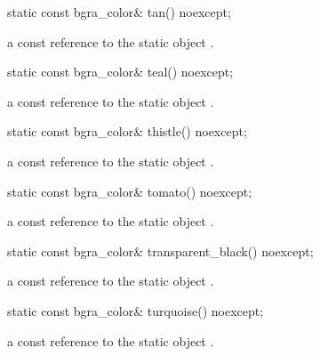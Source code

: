 \begin{itemdecl}
static const bgra_color& tan() noexcept;
\end{itemdecl}
\begin{itemdescr}
\pnum
\returns
a const reference to the static  object .
\end{itemdescr}

\begin{itemdecl}
static const bgra_color& teal() noexcept;
\end{itemdecl}
\begin{itemdescr}
\pnum
\returns
a const reference to the static  object .
\end{itemdescr}

\begin{itemdecl}
static const bgra_color& thistle() noexcept;
\end{itemdecl}
\begin{itemdescr}
\pnum
\returns
a const reference to the static  object .
\end{itemdescr}

\begin{itemdecl}
static const bgra_color& tomato() noexcept;
\end{itemdecl}
\begin{itemdescr}
\pnum
\returns
a const reference to the static  object .
\end{itemdescr}

\begin{itemdecl}
static const bgra_color& transparent_black() noexcept;
\end{itemdecl}
\begin{itemdescr}
\pnum
\returns
a const reference to the static  object .
\end{itemdescr}

\begin{itemdecl}
static const bgra_color& turquoise() noexcept;
\end{itemdecl}
\begin{itemdescr}
\pnum
\returns
a const reference to the static  object .
\end{itemdescr}

